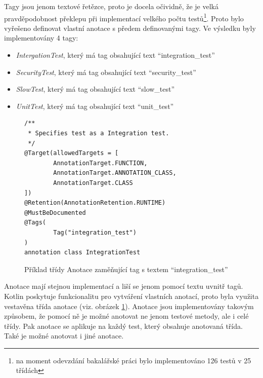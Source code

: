     Tagy jsou jenom textové řetězce, proto je docela očividně, že je velká pravděpodobnost překlepu při implementací velkého počtu testů\footnote{na moment odevzdání bakalářské práci bylo implementováno 126 testů v 25 třídách}. Proto bylo vyřešeno definovat vlastní anotace s předem definovanými tagy. Ve výsledku byly implementovány 4 tagy:
    \begin{itemize}
            \item \textit{IntergationTest}, který má tag obsahující text \enquote{integration\_test}
            \item \textit{SecurityTest}, který má tag obsahující text \enquote{security\_test}
            \item \textit{SlowTest}, který má tag obsahující text \enquote{slow\_test}
            \item \textit{UnitTest}, který má tag obsahující text \enquote{unit\_test}
    \end{itemize}
    
    \begin{figure}
        \begin{verbatim}
/**
 * Specifies test as a Integration test.
 */
@Target(allowedTargets = [
        AnnotationTarget.FUNCTION,
        AnnotationTarget.ANNOTATION_CLASS,
        AnnotationTarget.CLASS
])
@Retention(AnnotationRetention.RUNTIME)
@MustBeDocumented
@Tags(
        Tag("integration_test")
)
annotation class IntegrationTest
        \end{verbatim}
        \caption{Příklad třídy Anotace zaměňující tag s textem \enquote{integration\_test}} 
        \label{code:annotation-class}
    \end{figure}
    Anotace mají stejnou implementací a liší se jenom pomocí textu uvnitř tagů. Kotlin poskytuje funkcionalitu pro vytváření vlastních anotací, proto byla využita vestavěna třída anotace (viz. obrázek \ref{code:annotation-class}). Anotace jsou implementovány takovým způsobem, že pomocí ně je možné anotovat ne jenom testové metody, ale i celé třídy. Pak anotace se aplikuje na každý test, který obsahuje anotovaná třída. Také je možné anotovat i jiné anotace.

